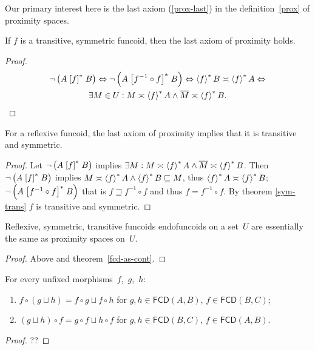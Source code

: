 Our primary interest here is the last axiom (\ref{prox-last}) in
the definition~\ref{prox} of proximity spaces.
\begin{prop}
If $f$ is a transitive, symmetric funcoid, then the last axiom of
proximity holds.\end{prop}
\begin{proof}
~
\begin{multline*}
\neg\left(A\mathrel{\left[f\right]^{\ast}}B\right)\Leftrightarrow\neg\left(A\mathrel{\left[f^{-1}\circ
f\right]^{\ast}}B\right)\Leftrightarrow\left\langle f\right\rangle ^{\ast}B\asymp\left\langle f\right\rangle ^{\ast}A\Leftrightarrow\\
\exists M\in U:M\asymp\left\langle f\right\rangle ^{\ast}A\wedge\overline{M}\asymp\left\langle f\right\rangle ^{\ast}B.
\end{multline*}
\end{proof}
\begin{prop}
For a reflexive funcoid, the last axiom of proximity implies that
it is transitive and symmetric.\end{prop}
\begin{proof}
Let $\neg\left(A\mathrel{\left[f\right]^{\ast}}B\right)$ implies $\exists M:M\asymp\left\langle f\right\rangle ^{\ast}A\wedge\overline{M}\asymp\left\langle f\right\rangle ^{\ast}B$.
Then $\neg\left(A\mathrel{\left[f\right]^{\ast}}B\right)$ implies $M\asymp\left\langle f\right\rangle ^{\ast}A\land\left\langle f\right\rangle ^{\ast}B\sqsubseteq M$,
thus $\left\langle f\right\rangle ^{\ast}A\asymp\left\langle f\right\rangle ^{\ast}B$; $\neg\left(A\mathrel{\left[f^{-1}\circ
f\right]^{\ast}}B\right)$
that is $f\sqsupseteq f^{-1}\circ f$ and thus $f=f^{-1}\circ f$.
By theorem \ref{sym-trans} $f$ is transitive and symmetric.\end{proof}
\begin{thm}
Reflexive, symmetric, transitive funcoids endofuncoids on a set~$U$
are essentially the same as proximity spaces on~$U$.\end{thm}
\begin{proof}
Above and theorem~\ref{fcd-as-cont}.\end{proof}

\begin{thm}
For every unfixed morphisms~$f$,~$g$,~$h$:
\begin{enumerate}
\item $f\circ(g\sqcup h)=f\circ g\sqcup f\circ h$ for $g,h\in\mathsf{FCD}(A,B)$,
$f\in\mathsf{FCD}(B,C)$;
\item $(g\sqcup h)\circ f=g\circ f\sqcup h\circ f$ for
$g,h\in\mathsf{FCD}(B,C)$,
$f\in\mathsf{FCD}(A,B)$.
\end{enumerate}
\end{thm}

\begin{proof}
??
\end{proof}
